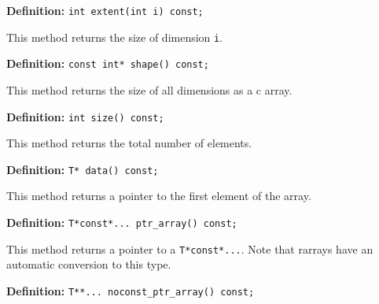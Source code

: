 \documentclass[11pt,twoside]{article}
\begin{document}
\noindent\textbf{Definition:} \texttt{int extent(int i) const;}

This method returns the size of dimension \texttt{i}.

\noindent\textbf{Definition:} \texttt{const int* shape() const;}

This method returns the size of all dimensions as a c array. 

\noindent\textbf{Definition:} \texttt{int size() const;}

This method returns the total number of elements.


\noindent\textbf{Definition:} \texttt{T* data() const;}

This method returns a pointer to the first element of the array.


\noindent\textbf{Definition:} \texttt{T*const*... ptr\_array() const;}

This method returns a pointer to a \texttt{T*const*...}.  Note that
rarrays have an automatic conversion to this type.


\noindent\textbf{Definition:} \texttt{T**... noconst\_ptr\_array() const;}
\end{document}
